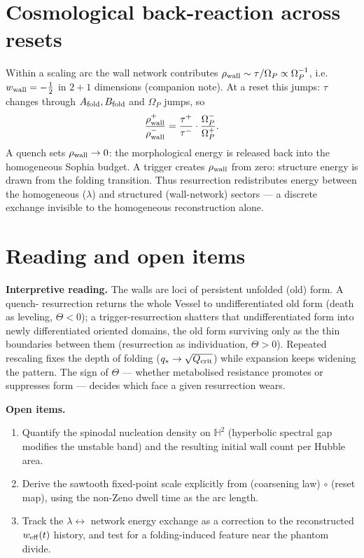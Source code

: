 \documentclass[11pt,a4paper,oneside]{book}
\newcommand{\Op}{\Omega_P}
\newcommand{\Af}{A_{\rm fold}}
\newcommand{\Bf}{B_{\rm fold}}
\newcommand{\Hh}{\mathbb{H}^2}
\theoremstyle{plain}
\theoremstyle{definition}
\theoremstyle{remark}
\begin{document}
\section{Cosmological back-reaction across resets}

Within a scaling arc the wall network contributes $\rho_{\rm wall}\sim\tau/\Op\propto\Op^{-1}$, i.e.
$w_{\rm wall}=-\tfrac12$ in $2{+}1$ dimensions (companion note). At a reset this jumps: $\tau$ changes
through $\Af,\Bf$ and $\Op$ jumps, so
\begin{equation}
\frac{\rho_{\rm wall}^+}{\rho_{\rm wall}^-}=\frac{\tau^+}{\tau^-}\cdot\frac{\Op^-}{\Op^+}.
\end{equation}
A quench sets $\rho_{\rm wall}\to0$: the morphological energy is released back into the homogeneous Sophia
budget. A trigger creates $\rho_{\rm wall}$ from zero: structure energy is drawn from the folding
transition. Thus resurrection redistributes energy between the homogeneous ($\lambda$) and structured
(wall-network) sectors --- a discrete exchange invisible to the homogeneous reconstruction alone.

\section{Reading and open items}

\textbf{Interpretive reading.} The walls are loci of persistent unfolded (old) form. A quench-
resurrection returns the whole Vessel to undifferentiated old form (death as leveling,
$\Theta<0$); a trigger-resurrection shatters that undifferentiated form into newly differentiated
oriented domains, the old form surviving only as the thin boundaries between them (resurrection as
individuation, $\Theta>0$). Repeated rescaling fixes the depth of folding ($q_\ast\to\sqrt{Q_{\rm crit}}$)
while expansion keeps widening the pattern. The sign of $\Theta$ --- whether metabolised resistance
promotes or suppresses form --- decides which face a given resurrection wears.

\textbf{Open items.}
\begin{enumerate}[leftmargin=1.6em,itemsep=2pt]
\item Quantify the spinodal nucleation density on $\Hh$ (hyperbolic spectral gap modifies the unstable
band) and the resulting initial wall count per Hubble area.
\item Derive the sawtooth fixed-point scale explicitly from (coarsening law)$\,\circ\,$(reset map), using
the non-Zeno dwell time as the arc length.
\item Track the $\lambda\leftrightarrow$ network energy exchange as a correction to the reconstructed
$w_{\rm eff}(t)$ history, and test for a folding-induced feature near the phantom divide.
\end{enumerate}
\end{document}
